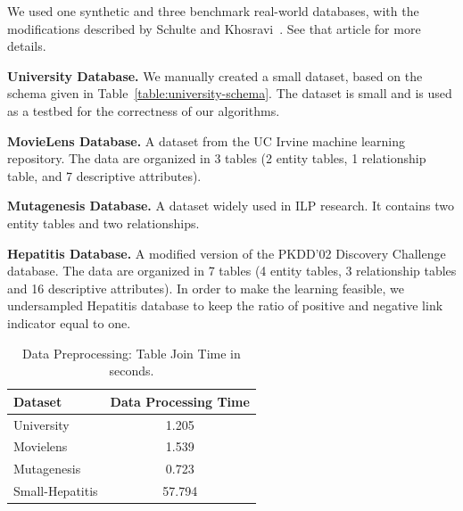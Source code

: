 \documentclass{article}
\begin{document}
We used one synthetic and 
three benchmark real-world databases, with the modifications described by Schulte and Khosravi~\cite{Schulte2012}. See that article for more
details.

\noindent\textbf{University Database.} We manually created a small dataset, based on the schema given in Table~\ref{table:university-schema}. 
The dataset is small and is used as a testbed for the correctness of our algorithms.

\noindent\textbf{MovieLens Database.} A dataset from the UC Irvine machine learning repository. The data are organized in 3 tables (2 entity tables, 1 relationship table, and 7 descriptive attributes). 

\noindent\textbf{Mutagenesis Database.} A dataset widely used in ILP research. %
It contains two entity tables and two relationships.

\noindent\textbf{Hepatitis Database.} A modified version of the PKDD'02 Discovery Challenge database. The data are organized in 7 tables (4 entity tables, 3 relationship tables and 16 descriptive attributes). In order to make the learning feasible, we undersampled Hepatitis database to keep the ratio of positive and negative link indicator equal to one. %



\begin{table} \centering
\begin{tabular}
{|l|c|}\hline 
 \textbf{Dataset} & \textbf{Data Processing Time} \\\hline
University&1.205 \\\hline
Movielens &1.539\\\hline
Mutagenesis &0.723\\\hline
Small-Hepatitis &57.794\\\hline

\end{tabular}
\caption{Data Preprocessing: Table Join Time  in seconds. %
 \label{table:cttimes}}
\end{table}
\end{document}

